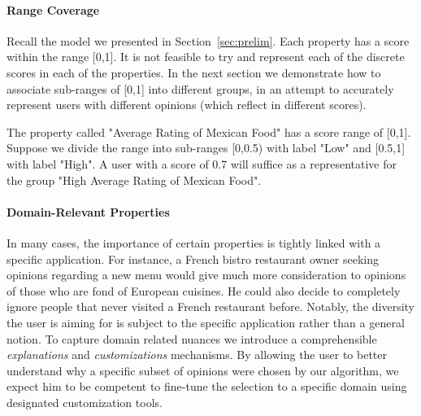\paragraph*{Range Coverage} Recall the model we presented in Section~\ref{sec:prelim}. Each property has a score within the range [0,1]. It is not feasible to try and represent each of the discrete scores in each of the properties. In the next section we demonstrate how to associate sub-ranges of [0,1] into different groups, in an attempt to accurately represent users with different opinions (which reflect in different scores).
\begin{example}
The property called "Average Rating of Mexican Food" has a score range of [0,1]. Suppose we divide the range into sub-ranges [0,0.5) with label "Low" and [0.5,1] with label "High". A user with a score of 0.7 will suffice as a representative for the group "High Average Rating of Mexican Food".
\end{example}

\paragraph*{Domain-Relevant Properties} 
In many cases, the importance of certain properties is tightly linked with a specific application. For instance, a French bistro restaurant owner seeking opinions regarding a new menu would give much more consideration to opinions of those who are fond of European cuisines. He could also decide to completely ignore people that never visited a French restaurant before. Notably, the diversity the user is aiming for is subject to the specific application rather than a general notion.
To capture domain related nuances we introduce a comprehensible \emph{explanations} and \emph{customizations} mechanisms. By allowing the user to better understand why a specific subset of opinions were chosen by our algorithm, we expect him to be competent to fine-tune the selection to a specific domain using designated customization tools.





